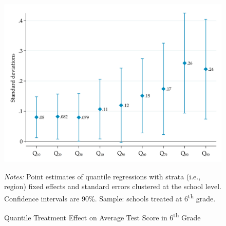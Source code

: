 \documentclass[11pt,a4paper]{article}
\begin{document}
\begin{figure}[ht!]
    
    \caption{Quantile Treatment Effect on Average Test Score  in 6\textsuperscript{th} Grade}
    \label{fig:qreg_media_grade6}
    \centering
    \includegraphics[width=14cm]{DataWork/Output/Figures/figA2-qreg_media_grade6.png}
    
    \begin{minipage}{0.825\textwidth}
        \small{\textit{Notes:} Point estimates of quantile regressions with strata (i.e., region) fixed effects and standard errors clustered at the school level. Confidence intervals are 90\%. Sample: schools treated at 6\textsuperscript{th} grade.}
    \end{minipage}
\end{figure}
\end{document}

